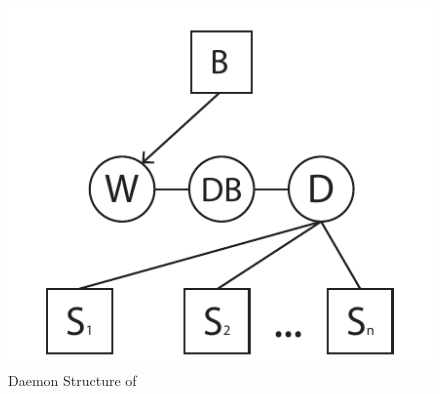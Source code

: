\begin{figure}[htb]
    \centering
    \includegraphics[width=\textwidth]{gfx/daemon_structure.pdf}
    \caption{Daemon Structure of \projectname{}}
    \label{fig:daemon_structure}
\end{figure}



